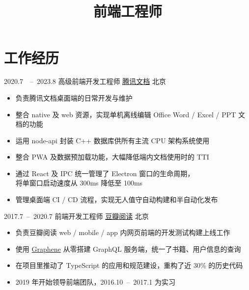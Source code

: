 \documentclass[11pt,a4paper,roman]{moderncv}   %
\title{前端工程师}                     %
\begin{document}
\maketitle


\section{工作经历}
\cventry
{2020.7\ \ –\ 2023.8}
{高级前端开发工程师}
{\href{https://docs.qq.com}{\underline{腾讯文档}}}
{北京}
{}
{
  \begin{itemize}
  \item 负责腾讯文档桌面端的日常开发与维护
  \item 整合 native 及 web 资源，实现单机离线编辑 Office Word / Excel / PPT 文档的功能
  \item 运用 node-api 封装 C++ 数据库供所有主流 CPU 架构系统使用 
  \item 整合 PWA 及数据预加载功能，大幅降低端内文档使用时的 TTI
  \item 通过 React 及 IPC 统一管理了 Electron 窗口的生命周期，\\将单窗口启动速度从 300ms 降低至 100ms
  \item 管理桌面端 CI / CD 流程，实现无人值守自动构建和半自动化发布
  \end{itemize}
}

\vspace{5pt}

\cventry
{2017.7\ –\ 2020.7}
{前端开发工程师}
{\href{https://read.douban.com}{\underline{豆瓣阅读}}}
{北京}
{}
{
  \begin{itemize}
  \item 负责豆瓣阅读 web / mobile / app 内网页前端的开发测试构建上线工作
  \item 使用 \href{https://graphene-python.org/}{Graphene} 从零搭建 GraphQL 服务端，统一了书籍、用户信息的查询
  \item 在项目里推动了 TypeScript 的应用和规范建设，重构了近 30\% 的历史代码
  \item 2019 年开始领导前端团队，2016.10\ –\ 2017.1 为实习
  \end{itemize}
}
\end{document}
